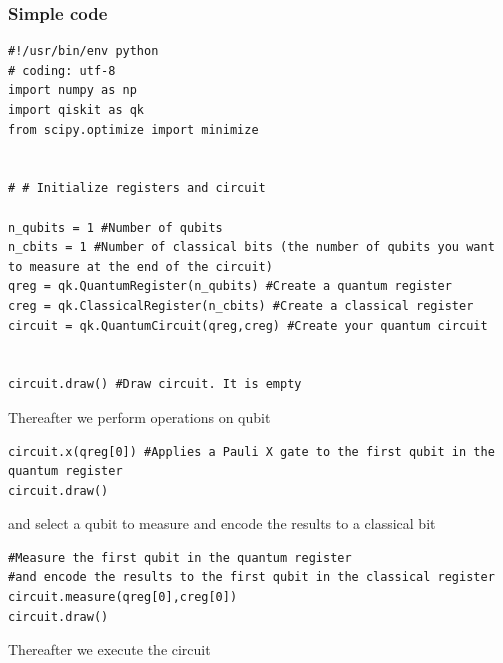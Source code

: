 \documentclass{beamer}
\begin{document}
\begin{frame}
\frametitle{Simple code}

\begin{verbatim}
#!/usr/bin/env python
# coding: utf-8
import numpy as np
import qiskit as qk
from scipy.optimize import minimize


# # Initialize registers and circuit

n_qubits = 1 #Number of qubits
n_cbits = 1 #Number of classical bits (the number of qubits you want to measure at the end of the circuit)
qreg = qk.QuantumRegister(n_qubits) #Create a quantum register
creg = qk.ClassicalRegister(n_cbits) #Create a classical register
circuit = qk.QuantumCircuit(qreg,creg) #Create your quantum circuit


circuit.draw() #Draw circuit. It is empty

\end{verbatim}


Thereafter we perform operations on qubit




\begin{verbatim}
circuit.x(qreg[0]) #Applies a Pauli X gate to the first qubit in the quantum register
circuit.draw()

\end{verbatim}


and select  a qubit to measure and encode the results to a classical bit






\begin{verbatim}
#Measure the first qubit in the quantum register
#and encode the results to the first qubit in the classical register
circuit.measure(qreg[0],creg[0])
circuit.draw()

\end{verbatim}


Thereafter we execute the circuit

























\end{frame}
\end{document}
